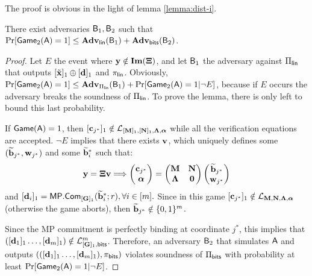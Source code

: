 The proof is obvious in the light of lemma \ref{lemma:dist-i}. 
%

\begin{lemma}
There exist adversaries $\mathsf{B}_1,\mathsf{B}_2$ such that $\Pr[\mathsf{Game}_2(\mathsf{A})=1]\leq\mathbf{Adv}_{\mathsf{lin}}(\mathsf{B}_1)+\mathbf{Adv}_{\mathsf{bits}}(\mathsf{B}_2)$.
\end{lemma}

\begin{proof}
Let $E$ the event where $\mathbf{y}\notin\mathbf{Im}(\mathbf{{\Xi}})$, and let $\mathsf{B}_1$ the adversary against $\Pi_{\mathsf{lin}}$ that outputs $[{\tilde{\mathbf{x}}}]_1\oplus[\mathbf{d}]_1$ and $\pi_{\mathsf{lin}}$. Obviously, $\Pr[\mathsf{Game}_2(\mathsf{A})=1]\leq\mathbf{Adv}_{\Pi_{\mathsf{lin}}}(\mathsf{B}_1)+\Pr[\mathsf{Game}_2(\mathsf{A})=1|\neg E]$, because 
if $E$ occurs the adversary breaks the soundness of
 $\Pi_{\mathsf{lin}}$. To prove the lemma, there is only left to bound this last probability.

If $\mathsf{Game}(\mathsf{A})=1$, then $[\mathbf{c}_{j^*}]_1\notin \mathcal{L}_{[\mathbf{{M}}]_1,[\mathbf{{N}}]_1,\mathbf{{\Lambda}},{\boldsymbol \alpha}}$ while all the verification equations are accepted. $\neg E$ implies that there exists $\mathbf{v}$, 
which uniquely defines some $(\widetilde{\mathbf{b}}_{j^*},\mathbf{w}_{j^*})$ and some $\widetilde{\mathbf{b}}_i^*$ such that:
$$
\mathbf{y}=\mathbf{{\Xi}} \mathbf{v}
\Longrightarrow
\left(\begin{matrix}\mathbf{c}_{j^*}\\ {\boldsymbol \alpha}\end{matrix}\right)=
\begin{pmatrix}
    \mathbf{{M}}       & \mathbf{{N}}\\
    \mathbf{{\Lambda}} & \mathbf{{0}}
\end{pmatrix}
\left(\begin{matrix}
    \widetilde{\mathbf{b}}_{j^*}\\
    \mathbf{w}_{j^*}
\end{matrix}\right)
$$
 and $[\mathbf{{d}}_i]_1=\mathsf{MP}.\mathsf{Com}_{[\mathbf{{G}}]_1}(\widetilde{\mathbf{b}}_i^*;r), \forall i\in[{m}].$
Since in this game $[\mathbf{c}_{j^*}]_1 \notin \mathcal{L}_{\mathbf{{M}},\mathbf{{N}},\mathbf{{\Lambda}},{\boldsymbol \alpha}}$ (otherwise the game aborts), then $\widetilde{\mathbf{b}}_{j^*}\notin\{0,1\}^{m}$. 

Since the MP commitment is perfectly binding at coordinate 
$j^*$, this implies that  $([\mathbf{d}_1]_1\ldots,[\mathbf{d}_{m}]_1)\notin \mathcal{L}_{[\mathbf{{G}}]_1,\mathsf{bits}}^m$. 
Therefore, an adversary $\mathsf{B}_2$ that simulates $\mathsf{A}$ and outputs $(([\mathbf{d}_1]_1\ldots,[\mathbf{d}_{m}]_1),\pi_{\mathsf{bits}})$ violates soundness of $\Pi_{\mathsf{bits}}$ with probability at least $\Pr[\mathsf{Game}_2(\mathsf{A})=1|\neg E]$.
\end{proof}

